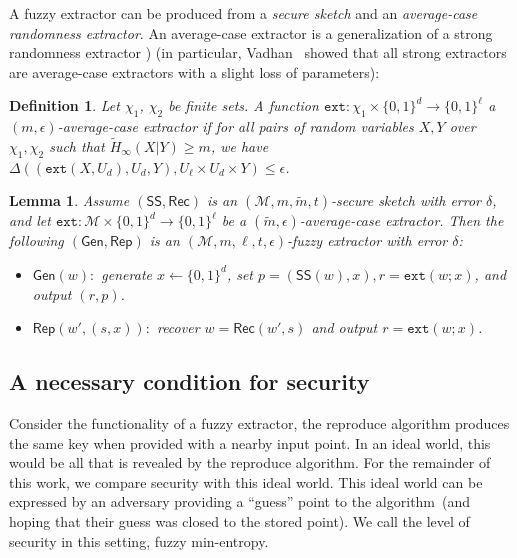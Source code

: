 \documentclass[11pt]{article}
\newcommand{\class}[1]{{\ensuremath{\mathsf{#1}}}}
\newcommand{\gen}{\ensuremath{\class{Gen}}\xspace}
\newcommand{\rep}{\ensuremath{\class{Rep}}\xspace}
\newcommand{\sketch}{\ensuremath{\class{SS}}\xspace}
\newcommand{\rec}{\ensuremath{\class{Rec}}\xspace}
\newcommand{\zo}{\ensuremath{\{0, 1\}}}
\newcommand{\ext}{\ensuremath{\mathtt{ext}}}
\newtheorem{lemma}[theorem]{Lemma}
\newtheorem{definition}[theorem]{Definition}
\begin{document}
A fuzzy extractor can be produced from a \emph{secure sketch} and an \emph{average-case randomness extractor}. An average-case extractor is a generalization of a strong randomness extractor \cite[Definition 2]{nisan1993randomness}) (in particular, Vadhan~\cite[Problem 6.8]{Vad12} showed that all strong extractors are average-case extractors with a slight loss of parameters):
\begin{definition}
Let $\chi_1$, $\chi_2$ be finite sets.
A function $\ext: \chi_1\times \{0,1\}^d \rightarrow \{0,1\}^\ell$ a \emph{$(m, \epsilon)$-average-case extractor} if for all pairs
of random variables $X, Y$ over $\chi_1, \chi_2$ such that
$\tilde{H}_\infty(X|Y) \ge m$, we have $\Delta((\ext(X, U_d), U_d, Y), U_\ell\times
U_d \times Y) \le \epsilon$.
\end{definition}

\begin{lemma}
\label{lem:fuzzy ext construction}
Assume $(\sketch, \rec)$ is an $(\mathcal{M}, m, \tilde{m}, t)$-secure sketch with error $\delta$, and let $\ext:\mathcal{M}\times \zo^d \rightarrow \zo^\ell$ be a $(\tilde{m}, \epsilon)$-average-case extractor.  Then the following $(\gen, \rep)$ is an $(\mathcal{M}, m, \ell, t, \epsilon)$-fuzzy extractor with error $\delta$:
\begin{itemize}
\item $\gen(w):$ generate $x\leftarrow \zo^d$, set $p=(\sketch(w), x), r=\ext(w;x)$, and output $(r,p)$.
\item $\rep(w', (s, x)):$ recover $w=\rec(w',s)$ and output $r=\ext(w;x)$.
\end{itemize}
\end{lemma}

\subsection{A necessary condition for security}
\label{sec:minimal conditions}
Consider the functionality of a fuzzy extractor, the reproduce algorithm produces the same key when provided with a nearby input point.  In an ideal world, this would be all that is revealed by the reproduce algorithm.  For the remainder of this work, we compare security with this ideal world.  This ideal world can be expressed by an adversary providing a ``guess'' point to the algorithm~(and hoping that their guess was closed to the stored point).  We call the level of security in this setting, fuzzy min-entropy.
\end{document}
